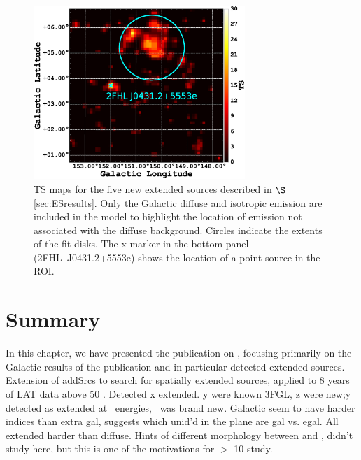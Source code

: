 \begin{figure}[!ht]
\begin{centering}
		\includegraphics[width=8cm]{Figures/l145_b0_ES_1_residTSmap_2FHL_zoom.eps}
		\caption{TS maps for the five new extended sources described in $\S$ \ref{sec:ESresults}.  Only the Galactic diffuse and isotropic emission are included in the model to highlight the location of emission not associated with the diffuse background. Circles indicate the extents of the fit disks. {The x marker in the bottom panel (2FHL~J0431.2+5553e) shows the location of a point source in the ROI.}
			\label{fig:6ES}}
		
	\end{centering}
\end{figure}

\section{\label{2FGL:summ}Summary} In this chapter, we have presented the publication on \twofhl, focusing primarily on the Galactic results of the publication and in particular detected extended sources. Extension of addSrcs to search for spatially extended sources, applied to 8 years  of LAT data above 50 \gev. Detected x extended. y were known 3FGL, z were new;y detected as extended at \gev~energies, \Gone ~was brand new. Galactic seem to have harder indices than extra gal, suggests which unid'd in the plane are gal vs. egal. All extended harder than diffuse. Hints of different morphology between \twofhl and \twofgl, didn't study here, but this is one of the motivations for $>$ 10 \gev study.






